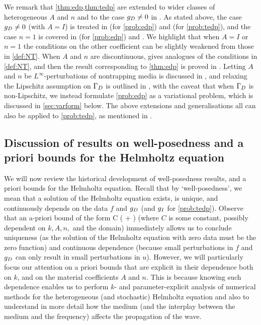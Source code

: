 We remark that \cref{thm:edp,thm:tedp} are extended to wider classes of heterogeneous $A$ and $n$ and to the case $g_{D} \neq 0$ in \cite{GrPeSp:19}. As stated above, the case $g_{D} \neq 0$ (with $A=I$) is treated in \cite[Theorem 2.19(ii)]{GrPeSp:19} (for \cref{prob:edp}) and \cite[Theorem A.6(iv)]{GrPeSp:19} (for \cref{prob:tedp}), and the case $n=1$ is covered in \cite[Theorem 2.19(i)]{GrPeSp:19} (for \cref{prob:edp}) and \cite[Theorem A.6(ii)]{GrPeSp:19}. We highlight that when $A=I$ or $n=1$ the conditions on the other coefficient can be slightly weakened from those in \cref{def:NT}. When $A$ and $n$ are discontinuous, \cite[Condition 2.6]{GrPeSp:19} gives analogues of the conditions in \cref{def:NT}, and then the result corresponding to \cref{thm:edp} is proved in \cite[Theorem 2.7]{GrPeSp:19}. Letting $A$ and $n$ be $L^\infty$-perturbations of nontrapping media is discussed in \cite[Remark 2.15]{GrPeSp:19}, and relaxing the Lipschitz assumption on $\Gamma_{D}$ is outlined in \cite[Remark 2.13]{GrPeSp:19}, with the caveat that when $\Gamma_{D}$ is non-Lipschitz, we instead formulate \cref{prob:edp} as a variational problem, which is discussed in \cref{sec:varform} below. The above extensions and generalisations all can also be applied to \cref{prob:tedp}, as mentioned in \cite[p. 2916]{GrPeSp:19}.

\subsection{Discussion of results on well-posedness and a priori bounds for the Helmholtz equation}\label{sec:wpdisc}

We will now review the historical development of well-posedness results, and a priori bounds for the Helmholtz equation. Recall that by `well-posedness', we mean that a solution of the Helmholtz equation exists, is unique, and continuously depends on the data $f$ and $g_{D}$ (and $g_{I}$ for \cref{prob:tedp}). Observe that an a-priori bound of the form
\beq\label{eq:bgbound}
 \leq C \mleft( + \N{\gD}\mright)
\eeq
(where $C$ is some constant, possibly dependent on $k, A, n,$ and the domain) immediately allows us to conclude uniqueness (as the solution of the Helmholtz equation with zero data must be the zero function) and continuous dependence (because small perturbations in $f$ and $g_{D}$ can only result in small perturbations in $u$). However, we will particularly focus our attention on a priori bounds that are explicit in their dependence both on $k$, and on the material coefficients $A$ and $n$. This is because knowing such dependence enables us to perform $k$- and parameter-explicit analysis of numerical methods for the heterogeneous (and stochastic) Helmholtz equation and also to understand in more detail how the medium (and the interplay between the medium and the frequency) affects the propagation of the wave.

